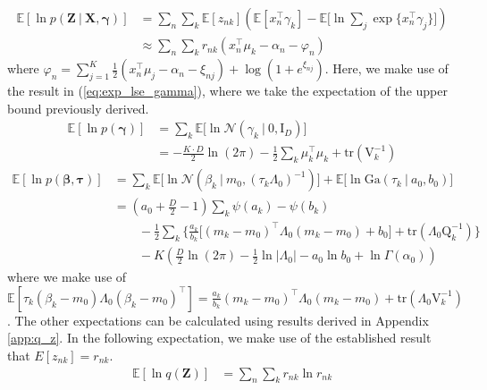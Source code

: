 \documentclass[twoside,11pt]{article}
\newcommand{\tr}{\intercal}
\newcommand{\eye}{\mathrm{I}}
\newcommand\given[1][]{\:#1\vert\:}
\newcommand{\transpose}[1]{#1^{\intercal}}
\newcommand{\nsum}{\sum\limits_{n}}
\newcommand{\ksum}{\sum\limits_{k}}
\newcommand{\boldbeta}{\boldsymbol\beta}
\newcommand{\boldgamma}{\boldsymbol\gamma}
\newcommand{\boldtau}{\boldsymbol\tau}
\newcommand{\E}{\mathbb{E}}
\newcommand{\pr}[1]{p \left( #1 \right)}
\begin{document}
\begin{equation} \label{eq:e2_deriv}
\begin{split}
	\E[\ln \pr{\mathbf{Z} \given \mathbf{X}, \boldgamma}] &= \nsum \ksum \E[z_{nk}] \left( \E[\transpose{x_n} \gamma_k] - \E\Big[\ln \sum_{j} \exp \{ \transpose{x_n}\gamma_j\}\Big]\right)\\
	&\approx \nsum \ksum r_{nk} \left( \transpose{x_n}\mu_k - \alpha_n - \varphi_n \right)
\end{split}
\end{equation}
where $\varphi_n = \sum\limits_{j=1}^K \frac{1}{2}\left(x_n^{\tr}\mu_j - \alpha_n - \xi_{nj}\right) + \log( 1 + e^{\xi_{nj}}).$
Here, we make use of the result in (\ref{eq:exp_lse_gamma}), where we take the expectation of the upper bound previously derived. 
\begin{equation} \label{eq:e3_deriv}
\begin{split}
	\E[\ln \pr{\boldgamma}] &= \ksum \E \Big[ \ln \mathcal{N}\left( \gamma_k \given 0, \eye_D\right)\Big] \\
	&= -\frac{K \cdot D}{2} \ln (2\pi) - \frac{1}{2} \ksum \transpose{\mu_k}\mu_k + \mathrm{tr} \left( \mathrm{V}_k^{-1} \right)
\end{split}
\end{equation}
\begin{equation} \label{eq:e4_deriv} %
\begin{split}
	\E[\ln \pr{\boldbeta, \boldtau}] &= \ksum \E\Big[\ln \mathcal{N}\left( \beta_k \given m_0, \left(\tau_k \Lambda_0 \right)^{-1} \right)\Big] + \E\Big[\ln \mathrm{Ga}\left( \tau_k \given a_0, b_0\right)\Big]\\
	&= \left( a_0 + \frac{D}{2} - 1 \right) \ksum \psi(a_k) - \psi(b_k)  \\
	& \qquad - \frac{1}{2}\ksum \Bigg\{ \frac{a_k}{b_k}\Big[\transpose{(m_k - m_0)} \Lambda_0 (m_k - m_0) + b_0 \Big] + \mathrm{tr} \left( \Lambda_0 \mathrm{Q}_{k}^{-1}\right) \Bigg\} \\
	& \qquad - K \left(\frac{D}{2}\ln(2\pi)  - \frac{1}{2}\ln |\Lambda_0| - a_0 \ln b_0 + \ln \Gamma(\alpha_0) \right)
\end{split}
\end{equation}
where we make use of $\E[\tau_k\transpose{(\beta_k - m_0) \Lambda_0 (\beta_k - m_0)}] =  \frac{a_k}{b_k} \transpose{(m_k - m_0)} \Lambda_0 (m_k - m_0) + \mathrm{tr} \left( \Lambda_0 \mathrm{V}_{k}^{-1}\right)$. The other expectations can be calculated using results derived in Appendix \ref{app:q_z}. In the following expectation, we make use of the established result that $E[z_{nk}] = r_{nk}$. 
\begin{equation} \label{eq:e5_deriv}
\begin{split}
	\E[\ln q(\mathbf{Z})] &=  \nsum \ksum r_{nk} \ln r_{nk}
\end{split}
\end{equation}
\end{document}
